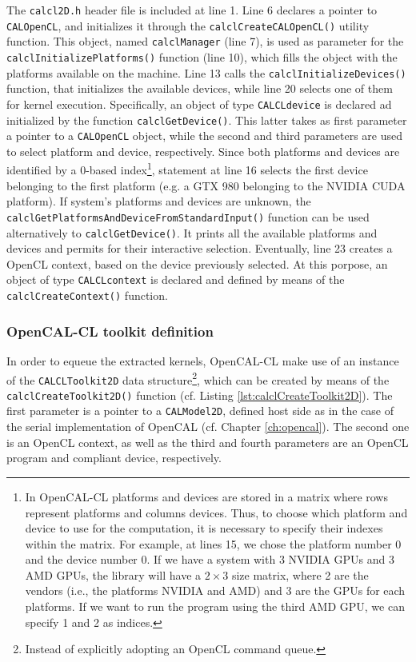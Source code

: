 The \verb'calcl2D.h' header file is included at line 1. Line 6
declares a pointer to \verb'CALOpenCL', and initializes it through the
\verb'calclCreateCALOpenCL()' utility function. This object, named
\verb'calclManager' (line 7), is used as parameter for the
\verb'calclInitializePlatforms()' function (line 10), which fills the
object with the platforms available on the machine. Line 13 calls the
\verb'calclInitializeDevices()' function, that initializes the
available devices, while line 20 selects one of them for kernel
execution. Specifically, an object of type \verb'CALCLdevice' is
declared ad initialized by the function \verb'calclGetDevice()'. This
latter takes as first parameter a pointer to a \verb'CALOpenCL'
object, while the second and third parameters are used to select
platform and device, respectively. Since both platforms and devices
are identified by a 0-based index\footnote{In OpenCAL-CL platforms and
  devices are stored in a matrix where rows represent platforms and
  columns devices. Thus, to choose which platform and device to use
  for the computation, it is necessary to specify their indexes within
  the matrix. For example, at lines 15, we chose the platform number 0
  and the device number 0. If we have a system with 3 NVIDIA GPUs and
  3 AMD GPUs, the library will have a $2 \times 3$ size matrix, where
  2 are the vendors (i.e., the platforms NVIDIA and AMD) and 3 are the
  GPUs for each platforms. If we want to run the program using the
  third AMD GPU, we can specify 1 and 2 as indices.}, statement at
line 16 selects the first device belonging to the first platform
(e.g. a GTX 980 belonging to the NVIDIA CUDA platform). If system's
platforms and devices are unknown, the
\verb'calclGetPlatformsAndDeviceFromStandardInput()' function can be
used alternatively to \verb'calclGetDevice()'. It prints all the
available platforms and devices and permits for their interactive
selection. Eventually, line 23 creates a OpenCL context, based on the
device previously selected. At this porpose, an object of type
\verb'CALCLcontext' is declared and defined by means of the
\verb'calclCreateContext()' function.


\subsubsection{OpenCAL-CL toolkit definition}

In order to equeue the extracted kernels, OpenCAL-CL make use of an
instance of the \verb'CALCLToolkit2D' data structure\footnote{Instead
  of explicitly adopting an OpenCL command queue.}, which can be
created by means of the \verb'calclCreateToolkit2D()' function
(cf. Listing \ref{lst:calclCreateToolkit2D}). The first parameter is a
pointer to a \verb'CALModel2D', defined host side as in the case of the
serial implementation of OpenCAL (cf. Chapter \ref{ch:opencal}). The
second one is an OpenCL context, as well as the third and fourth
parameters are an OpenCL program and compliant device, respectively.

